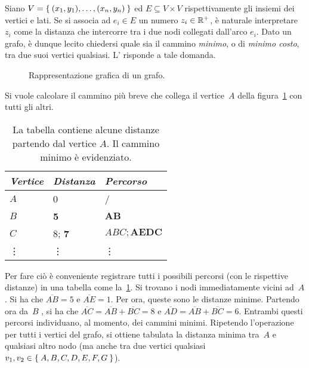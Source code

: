 Siano $V=\Set{(x_1,y_1),\dots,(x_n,y_n)}$ ed $E\subseteq V\times V$ rispettivamente gli insiemi dei vertici e lati. 
Se si associa ad $e_{i}\in E$ un numero $z_i\in\mathbb{R}^+$, è naturale interpretare $z_i$ come la distanza che intercorre tra i due nodi collegati dall'arco $e_i$.
Dato un grafo, è dunque lecito chiedersi quale sia il cammino \emph{minimo}, o di \emph{minimo costo}, tra due suoi vertici qualsiasi.
L' risponde a tale domanda.

\begin{figure}
	\centering

	\caption{Rappresentazione grafica di un grafo.}
	\label{fig:dij}
\end{figure}
Si vuole calcolare il cammino più breve che collega il vertice~$A$ %
della figura~\ref{fig:dij} con tutti gli altri.
\begin{table}
	\centering
\caption{La tabella contiene alcune distanze partendo dal vertice $A$. Il cammino minimo è evidenziato.}
\label{tab:dij}
\begin{tabular}{l l l}
	\toprule
\emph{Vertice}	&\emph{Distanza}		&\emph{Percorso}		\\
	\midrule
$A$ 			&0			& /					\\
$B$ 			&\textbf{5}		&$\mathbf{AB}$			\\
$C$ 			&8; \textbf{7}	&$ABC; \mathbf{AEDC}$		\\
\vdots 		&\vdots 		& \vdots 				\\
	\bottomrule
\end{tabular}
\end{table}
Per fare ciò è conveniente registrare tutti i possibili percorsi (con le rispettive distanze) in una tabella come la~\ref{tab:dij}.
Si trovano i nodi immediatamente vicini ad~$A$. %
Si ha che $\overline{AB}=5$ e $\overline{AE}=1$.
Per ora, queste sono le distanze minime.
Partendo ora da~$B$%
, si ha che $\overline{AC}=\overline{AB}+\overline{BC}=8$ e $\overline{AD}=\overline{AB}+\overline{BC}=6$.
Entrambi questi percorsi individuano, al momento, dei cammini minimi.
Ripetendo l'operazione per tutti i vertici del grafo, si ottiene tabulata la distanza minima tra~$A$%
 e qualsiasi altro nodo (ma anche tra due vertici qualsiasi $v_1,v_2\in\Set{A, B, C, D, E, F, G}$).


